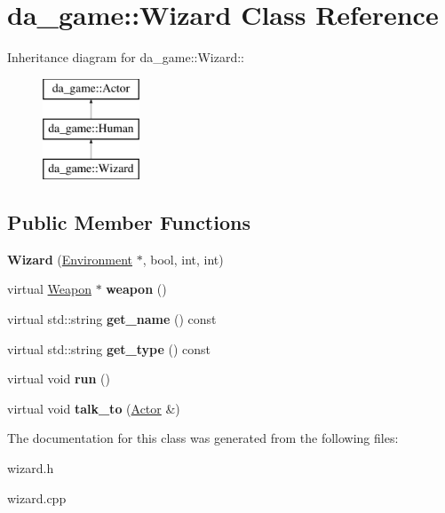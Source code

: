 \hypertarget{classda__game_1_1Wizard}{
\section{da\_\-game::Wizard Class Reference}
\label{classda__game_1_1Wizard}
}
Inheritance diagram for da\_\-game::Wizard::\begin{figure}[H]
\begin{center}
\leavevmode
\includegraphics[height=3cm]{classda__game_1_1Wizard}
\end{center}
\end{figure}
\subsection*{Public Member Functions}
\begin{DoxyCompactItemize}
\item 
\hypertarget{classda__game_1_1Wizard_a12946b6b8b4377d3bc921f4acec267af}{
{\bfseries Wizard} (\hyperlink{classda__game_1_1Environment}{Environment} $\ast$, bool, int, int)}
\label{classda__game_1_1Wizard_a12946b6b8b4377d3bc921f4acec267af}

\item 
\hypertarget{classda__game_1_1Wizard_aea51ce7fcb9f92ca5176f5cbcbcb6775}{
virtual \hyperlink{classda__game_1_1Weapon}{Weapon} $\ast$ {\bfseries weapon} ()}
\label{classda__game_1_1Wizard_aea51ce7fcb9f92ca5176f5cbcbcb6775}

\item 
\hypertarget{classda__game_1_1Wizard_a774b9675e1817c6f7c2d0852a6c2f3bb}{
virtual std::string {\bfseries get\_\-name} () const }
\label{classda__game_1_1Wizard_a774b9675e1817c6f7c2d0852a6c2f3bb}

\item 
\hypertarget{classda__game_1_1Wizard_afd862632f5d1f6e2f0c0305226b3ebfd}{
virtual std::string {\bfseries get\_\-type} () const }
\label{classda__game_1_1Wizard_afd862632f5d1f6e2f0c0305226b3ebfd}

\item 
\hypertarget{classda__game_1_1Wizard_a242950311ea6d71faf9dfeb86918e510}{
virtual void {\bfseries run} ()}
\label{classda__game_1_1Wizard_a242950311ea6d71faf9dfeb86918e510}

\item 
\hypertarget{classda__game_1_1Wizard_aae7693d908c0e2d79bfc527cdb270548}{
virtual void {\bfseries talk\_\-to} (\hyperlink{classda__game_1_1Actor}{Actor} \&)}
\label{classda__game_1_1Wizard_aae7693d908c0e2d79bfc527cdb270548}

\end{DoxyCompactItemize}


The documentation for this class was generated from the following files:\begin{DoxyCompactItemize}
\item 
wizard.h\item 
wizard.cpp\end{DoxyCompactItemize}
